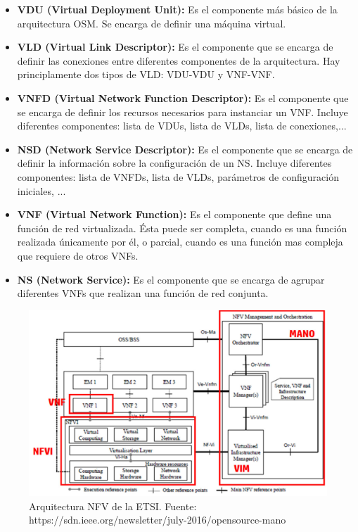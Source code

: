 \begin{itemize}
	\item \textbf{VDU (Virtual Deployment Unit):} Es el componente más básico de la arquitectura OSM. Se encarga de definir una máquina virtual. 
	
	\item \textbf{VLD (Virtual Link Descriptor):} Es el componente que se encarga de definir las conexiones entre diferentes componentes de la arquitectura. Hay principlamente dos tipos de VLD: VDU-VDU y VNF-VNF.
	
	\item \textbf{VNFD (Virtual Network Function Descriptor):} Es el componente que se encarga de definir los recursos necesarios para instanciar un VNF. Incluye diferentes componentes: lista de VDUs, lista de VLDs, lista de conexiones,...
	
	\item \textbf{NSD (Network Service Descriptor):} Es el componente que se encarga de definir la información sobre la configuración de un NS. Incluye diferentes componentes: lista de VNFDs, lista de VLDs, parámetros de configuración iniciales, ...
	
	\item \textbf{VNF (Virtual Network Function):} Es el componente que define una función de red virtualizada. Ésta puede ser completa, cuando es una función realizada únicamente por él, o parcial, cuando es una función mas compleja que requiere de otros VNFs.
	
	\item \textbf{NS (Network Service):} Es el componente que se encarga de agrupar diferentes VNFs que realizan una función de red conjunta.
\end{itemize}

\begin{figure}[!ht]
	\centering
	\includegraphics[width=0.8\linewidth]{imagenes/nfv_etsi_Arch}
	\caption{Arquitectura NFV de la ETSI. 
		Fuente: https://sdn.ieee.org/newsletter/july-2016/opensource-mano}
	\label{fig:nfvetsiarch}
\end{figure}

